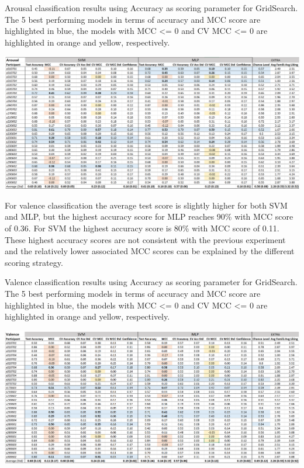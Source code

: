 \begin{table}[h!]
  \caption{Arousal classification results using Accuracy as scoring parameter for GridSearch. The 5 best performing models in terms of accuracy and MCC score are highlighted in blue, the models with MCC <= 0 and CV MCC <= 0 are highlighted in orange and yellow, respectively.}
  \label{tbl:arousal_max_acc_results}
  \includegraphics[width=\linewidth]{img/results/arousal_max_acc_results.png}
\end{table}

For valence classification the average test score is slightly higher for both SVM and MLP, but the highest accuracy score for MLP reaches 90\% with MCC score of 0.36. For SVM the highest accuracy score is 80\% with MCC score of 0.11. These highest accuracy scores are not consistent with the previous experiment and the relatively lower associated MCC scores can be explained by the different scoring strategy.

\begin{table}[h!]
  \caption{Valence classification results using Accuracy as scoring parameter for GridSearch. The 5 best performing models in terms of accuracy and MCC score are highlighted in blue, the models with MCC <= 0 and CV MCC <= 0 are highlighted in orange and yellow, respectively.}
  \label{tbl:valence_max_acc_results}
  \includegraphics[width=\linewidth]{img/results/valence_max_acc_results.png}
\end{table}

